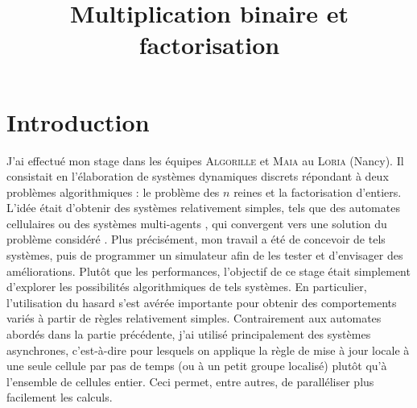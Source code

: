 \documentclass[11pt, openany, a4paper]{article}
\newcommand{\ANNOT}[1]{
  ~\linebreak
  \centerline{
    \large\fcolorbox{black}{bleuclair}{
      \begin{minipage}[h]{.8\linewidth}
      #1
      \end{minipage}
    }
  }
}
\begin{document}
\renewcommand{\labelitemi}{$\bullet$}

\title{\vspace{-3em}Multiplication binaire et factorisation}
\date{}


\maketitle

% 
\vspace{-5em}
\part*{Introduction}

J'ai effectué mon stage dans les équipes \textsc{Algorille} et \textsc{Maia} au \textsc{Loria} (Nancy). Il consistait en l'élaboration de systèmes dynamiques discrets répondant à deux problèmes algorithmiques : le problème des $n$ reines et la factorisation d'entiers. L'idée était d'obtenir des systèmes relativement simples, tels que des automates cellulaires ou des systèmes multi-agents \cite{ChevFat08}, qui convergent vers une solution du problème considéré \cite{BahiC06}. Plus précisément, mon travail a été de concevoir de tels systèmes, puis de programmer un simulateur afin de les tester et d'envisager des améliorations. Plutôt que les performances, l'objectif de ce stage était simplement d'explorer les possibilités algorithmiques de tels systèmes. En particulier, l'utilisation du hasard s'est avérée importante pour obtenir des comportements variés à partir de règles relativement simples. Contrairement aux automates abordés dans la partie précédente, j'ai utilisé principalement des systèmes asynchrones, c'est-à-dire pour lesquels on applique la règle de mise à jour locale à une seule cellule par pas de temps (ou à un petit groupe localisé) plutôt qu'à l'ensemble de cellules entier. Ceci permet, entre autres, de paralléliser plus facilement les calculs.


\end{document}
